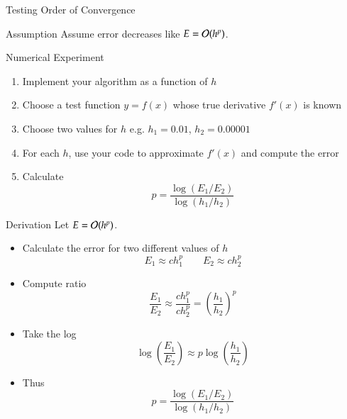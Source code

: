 \documentclass[10pt]{beamer}
\begin{document}
\begin{frame}{Testing Order of Convergence}

\begin{block}{Assumption}
    Assume error decreases like $E= {\mathcal{O}}(h^p)$.
\end{block}


    \vspace{3mm}
\begin{block}{Numerical Experiment}
    \begin{enumerate}
        \item Implement your algorithm as a function of $h$
        \item Choose a test function $y=f(x)$ whose true derivative $f'(x)$ is known
        \item Choose two values for $h$ e.g. $h_1 = 0.01$, $h_2 = 0.00001$
        \item For each $h$, use your code to approximate $f'(x)$ and compute the error
        \item Calculate 
            \begin{equation*}
                p = \frac{ \log(E_1/E_2) }{ \log(h_1/h_2) }
            \end{equation*}
    \end{enumerate}
\end{block}
\end{frame}
\begin{frame}{Derivation}
    Let $E={\mathcal{O}}(h^p)$. 
    \vspace{3mm}
    \begin{itemize}
        \item Calculate the error for two different values of $h$
            $$E_1 \approx c h_1^p \quad\quad E_2 \approx c h_2 ^p $$
        \item Compute ratio 
            $$\frac{E_1}{E_2} \approx \frac{c h_1^p}{c h_2 ^p} = \left(\frac{h_1}{h_2}\right)^p$$
        \item Take the log 
            $$ \log\left(\frac{E_1}{E_2}\right) \approx  p \log\left(\frac{h_1}{h_2}\right)$$
        \item Thus  
            $$p = \frac{ \log(E_1/E_2) }{ \log(h_1/h_2) }$$
    \end{itemize}
\end{frame}
\end{document}
